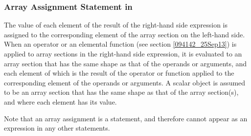 \subsubsection{Array Assignment Statement in {\XMPC}}
\label{subsubsec:Array assignment statements in C}






The value of each element of the result of the right-hand side expression is
assigned to the corresponding element of the array section on the
left-hand side.
%
When an operator or an elemental function (see section
\ref{094142_25Sep13}) is applied to array sections in the right-hand side
expression, it is evaluated to an array section that has the same shape
as that of the operands or arguments, and each element of which is the
result of the operator or function applied to the corresponding element
of the operands or arguments. A scalar object is assumed to be an array
section that has the same shape as that of the array section(s), and
where each element has its value.

Note that an array assignment is a statement, and therefore cannot
appear as an expression in any other statements.


